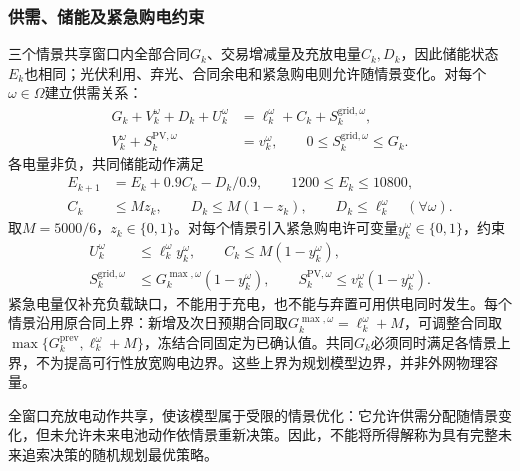 \subsubsection{供需、储能及紧急购电约束}
三个情景共享窗口内全部合同$G_k$、交易增减量及充放电量$C_k,D_k$，因此储能状态$E_k$也相同；光伏利用、弃光、合同余电和紧急购电则允许随情景变化。对每个$\omega\in\Omega$建立供需关系：
\begin{align}
 G_k+V_k^\omega+D_k+U_k^\omega&=\ell_k^\omega+C_k+S_k^{\mathrm{grid},\omega},\\
 V_k^\omega+S_k^{\mathrm{PV},\omega}&=v_k^\omega,\qquad
 0\le S_k^{\mathrm{grid},\omega}\le G_k.
\end{align}
各电量非负，共同储能动作满足
\begin{align}
 E_{k+1}&=E_k+0.9C_k-D_k/0.9,\qquad1200\le E_k\le10800,\\
 C_k&\le Mz_k,\qquad D_k\le M(1-z_k),\qquad D_k\le\ell_k^\omega\quad(\forall\omega).
\end{align}
取$M=5000/6$，$z_k\in\{0,1\}$。对每个情景引入紧急购电许可变量$y_k^\omega\in\{0,1\}$，约束
\begin{align}
 U_k^\omega&\le\ell_k^\omega y_k^\omega,\qquad C_k\le M(1-y_k^\omega),\\
 S_k^{\mathrm{grid},\omega}&\le G_k^{\max,\omega}(1-y_k^\omega),\qquad
 S_k^{\mathrm{PV},\omega}\le v_k^\omega(1-y_k^\omega).
\end{align}
紧急电量仅补充负载缺口，不能用于充电，也不能与弃置可用供电同时发生。每个情景沿用原合同上界：新增及次日预期合同取$G_k^{\max,\omega}=\ell_k^\omega+M$，可调整合同取$\max\{G_k^{\mathrm{prev}},\ell_k^\omega+M\}$，冻结合同固定为已确认值。共同$G_k$必须同时满足各情景上界，不为提高可行性放宽购电边界。这些上界为规划模型边界，并非外网物理容量。

全窗口充放电动作共享，使该模型属于受限的情景优化：它允许供需分配随情景变化，但未允许未来电池动作依情景重新决策。因此，不能将所得解称为具有完整未来追索决策的随机规划最优策略。

